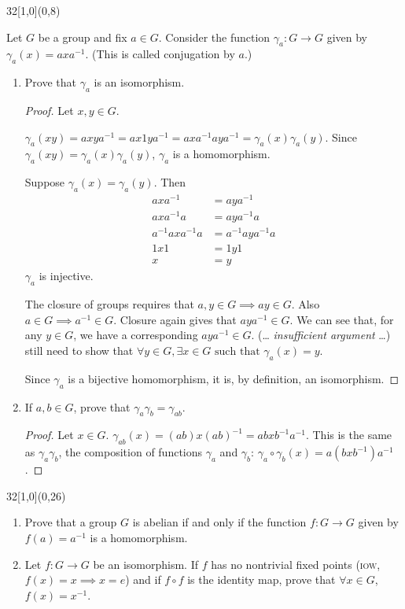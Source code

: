 \documentclass[12pt]{article}
\newenvironment{exercise}[2]{\begin{textblock}{32}[1,0](0,#2)\noindent#1\end{textblock}}{\vspace{1in}}
\begin{document}
\begin{exercise}{1.47}{8}
	{\noindent}Let $G$ be a group and fix $a\in G$. Consider the function $\gamma_a:G\to G$ given by $\gamma_a(x)=axa^{-1}$. (This is called conjugation by $a$.)
	\begin{enumerate}[(i.)]
		\item Prove that $\gamma_a$ is an isomorphism.
		\bigskip
		\begin{proof}
			Let $x,y\in G$.
			\par
			$\gamma_a(xy)=axya^{-1}=ax1ya^{-1}=axa^{-1}aya^{-1}=\gamma_a(x)\gamma_a(y)$.
			Since $\gamma_a(xy)=\gamma_a(x)\gamma_a(y)$, $\gamma_a$ is a homomorphism.
			\par
			Suppose $\gamma_a(x)=\gamma_a(y)$. Then
			\begin{align*}
				axa^{-1}&=aya^{-1}\\
				axa^{-1}a&=aya^{-1}a\\
				a^{-1}axa^{-1}a&=a^{-1}aya^{-1}a\\
				1x1&=1y1\\
				x&=y
			\end{align*}
			$\gamma_a$ is injective.
			\par
			The closure of groups requires that $a,y\in G\implies ay\in G$. Also $a\in G\implies a^{-1}\in G$. Closure again gives that $aya^{-1}\in G$. We can see that, for any $y\in G$, we have a corresponding $aya^{-1}\in G$.
			(\dots\textit{ insufficient argument }\dots) still need to show that $\forall y\in G,\exists x\in G\text{ such that }\gamma_a(x)=y$.
			\par
			Since $\gamma_a$ is a bijective homomorphism, it is, by definition, an isomorphism.
		\end{proof}

		\item If $a,b\in G$, prove that $\gamma_a\gamma_b=\gamma_{ab}$.
		\bigskip
		\begin{proof}
			Let $x\in G$. $\gamma_{ab}(x)=(ab)x(ab)^{-1}=abxb^{-1}a^{-1}$. This is the same as $\gamma_a\gamma_b$, the composition of functions $\gamma_a$ and $\gamma_b$: $\gamma_a\circ \gamma_b(x)=a(bxb^{-1})a^{-1}$.
		\end{proof}
	\end{enumerate}
\end{exercise}

\begin{exercise}{1.50}{26}
	\quad
	\begin{enumerate}[(i.)]
		\item Prove that a group $G$ is abelian if and only if the function $f:G\to G$ given by $f(a)=a^{-1}$ is a homomorphism.
		\bigskip

		\item Let $f:G\to G$ be an isomorphism. If $f$ has no nontrivial fixed points (\textsc{iow}, $f(x)=x\implies x=e$) and if $f\circ f$ is the identity map, prove that $\forall x\in G$, $f(x)=x^{-1}$.
	\end{enumerate}
\end{exercise}
\end{document}
